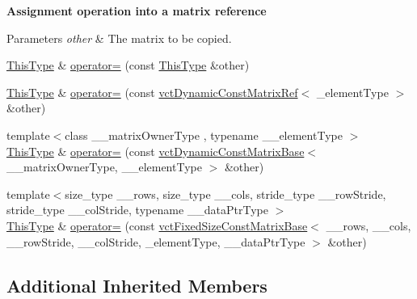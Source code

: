 \begin{Indent}{\bf Assignment operation into a matrix reference}\par
{\em 
\begin{DoxyParams}{Parameters}
{\em other} & The matrix to be copied. \\
\hline
\end{DoxyParams}
}\begin{DoxyCompactItemize}
\item 
\hyperlink{classvct_dynamic_matrix_ref_ac01200e3df0afe95f5d3948da84c8551}{This\-Type} \& \hyperlink{classvct_dynamic_matrix_ref_a9a5e1c7ac72ebebc31cc14b28a67e8e8}{operator=} (const \hyperlink{classvct_dynamic_matrix_ref_ac01200e3df0afe95f5d3948da84c8551}{This\-Type} \&other)
\item 
\hyperlink{classvct_dynamic_matrix_ref_ac01200e3df0afe95f5d3948da84c8551}{This\-Type} \& \hyperlink{classvct_dynamic_matrix_ref_a4746225777213ee01fd7d8bc7cdb11c3}{operator=} (const \hyperlink{classvct_dynamic_const_matrix_ref}{vct\-Dynamic\-Const\-Matrix\-Ref}$<$ \-\_\-element\-Type $>$ \&other)
\item 
{\footnotesize template$<$class \-\_\-\-\_\-matrix\-Owner\-Type , typename \-\_\-\-\_\-element\-Type $>$ }\\\hyperlink{classvct_dynamic_matrix_ref_ac01200e3df0afe95f5d3948da84c8551}{This\-Type} \& \hyperlink{classvct_dynamic_matrix_ref_a6574495be878c529a799c0f44312e462}{operator=} (const \hyperlink{classvct_dynamic_const_matrix_base}{vct\-Dynamic\-Const\-Matrix\-Base}$<$ \-\_\-\-\_\-matrix\-Owner\-Type, \-\_\-\-\_\-element\-Type $>$ \&other)
\item 
{\footnotesize template$<$size\-\_\-type \-\_\-\-\_\-rows, size\-\_\-type \-\_\-\-\_\-cols, stride\-\_\-type \-\_\-\-\_\-row\-Stride, stride\-\_\-type \-\_\-\-\_\-col\-Stride, typename \-\_\-\-\_\-data\-Ptr\-Type $>$ }\\\hyperlink{classvct_dynamic_matrix_ref_ac01200e3df0afe95f5d3948da84c8551}{This\-Type} \& \hyperlink{classvct_dynamic_matrix_ref_aded81d26dc4b992479650ac06295257f}{operator=} (const \hyperlink{classvct_fixed_size_const_matrix_base}{vct\-Fixed\-Size\-Const\-Matrix\-Base}$<$ \-\_\-\-\_\-rows, \-\_\-\-\_\-cols, \-\_\-\-\_\-row\-Stride, \-\_\-\-\_\-col\-Stride, \-\_\-element\-Type, \-\_\-\-\_\-data\-Ptr\-Type $>$ \&other)
\end{DoxyCompactItemize}
\end{Indent}
\subsection*{Additional Inherited Members}


